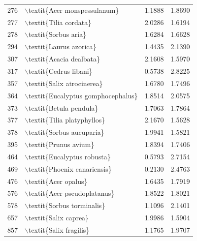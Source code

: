 \begin{table}[ht]
\begin{tabular}{llrr}
  276 & $\backslash$textit\{Acer monspessulanum\} & 1.1888 & 1.8690 \\ 
  277 & $\backslash$textit\{Tilia cordata\} & 2.0286 & 1.6194 \\ 
  278 & $\backslash$textit\{Sorbus aria\} & 1.6284 & 1.6628 \\ 
  294 & $\backslash$textit\{Laurus azorica\} & 1.4435 & 2.1390 \\ 
  307 & $\backslash$textit\{Acacia dealbata\} & 2.1608 & 1.5970 \\ 
  317 & $\backslash$textit\{Cedrus libani\} & 0.5738 & 2.8225 \\ 
  357 & $\backslash$textit\{Salix atrocinerea\} & 1.6780 & 1.7496 \\ 
  364 & $\backslash$textit\{Eucalyptus gomphocephalus\} & 1.8514 & 2.0575 \\ 
  373 & $\backslash$textit\{Betula pendula\} & 1.7063 & 1.7864 \\ 
  377 & $\backslash$textit\{Tilia platyphyllos\} & 2.1670 & 1.5628 \\ 
  378 & $\backslash$textit\{Sorbus aucuparia\} & 1.9941 & 1.5821 \\ 
  395 & $\backslash$textit\{Prunus avium\} & 1.8394 & 1.7406 \\ 
  464 & $\backslash$textit\{Eucalyptus robusta\} & 0.5793 & 2.7154 \\ 
  469 & $\backslash$textit\{Phoenix canariensis\} & 0.2130 & 2.4763 \\ 
  476 & $\backslash$textit\{Acer opalus\} & 1.6435 & 1.7919 \\ 
  576 & $\backslash$textit\{Acer pseudoplatanus\} & 1.8522 & 1.8021 \\ 
  578 & $\backslash$textit\{Sorbus torminalis\} & 1.1096 & 2.1401 \\ 
  657 & $\backslash$textit\{Salix caprea\} & 1.9986 & 1.5904 \\ 
  857 & $\backslash$textit\{Salix fragilis\} & 1.1765 & 1.9707 \\ 
   \hline
\end{tabular}
\end{table}
